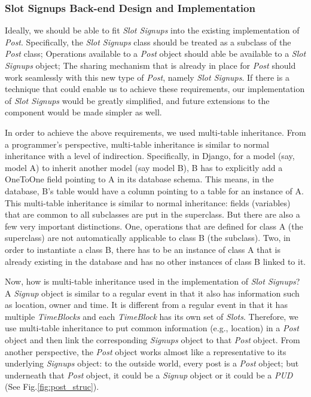 \documentclass[a4paper]{article}
\begin{document}
\subsubsection{Slot Signups Back-end Design and Implementation}
Ideally, we should be able to fit \emph{Slot Signups} into the existing implementation of \emph{Post}. Specifically, the \emph{Slot Signups} class should be treated as a subclass of the \emph{Post} class; Operations available to a \emph{Post} object should able be available to a \emph{Slot Signups} object; The sharing mechanism that is already in place for \emph{Post} should work seamlessly with this new type of \emph{Post}, namely \emph{Slot Signups}. If there is a technique that could enable us to achieve these requirements, our implementation of \emph{Slot Signups} would be greatly simplified, and future extensions to the component would be made simpler as well.

In order to achieve the above requirements, we used multi-table inheritance. From a programmer's perspective, multi-table inheritance is similar to normal inheritance with a level of indirection. Specifically, in Django, for a model (say, model A) to inherit another model (say model B), B has to explicitly add a OneToOne field pointing to A in its database schema. This means, in the database, B's table would have a column pointing to a table for an instance of A. This multi-table inheritance is similar to normal inheritance: fields (variables) that are common to all subclasses are put in the superclass. But there are also a few very important distinctions. One, operations that are defined for class A (the superclass) are not automatically applicable to class B (the subclass). Two, in order to instantiate a class B, there has to be an instance of class A that is already existing in the database and has no other instances of class B linked to it. 

Now, how is multi-table inheritance used in the implementation of \emph{Slot Signups}? A \emph{Signup} object is similar to a regular event in that it also has information such as location, owner and time. It is different from a regular event in that it has multiple \emph{TimeBlocks} and each \emph{TimeBlock} has its own set of \emph{Slots}. Therefore, we use multi-table inheritance to put common information (e.g., location) in a \emph{Post} object and then link the corresponding \emph{Signups} object to that \emph{Post} object. From another perspective, the \emph{Post} object works almost like a representative to its underlying \emph{Signups} object: to the outside world, every post is a \emph{Post} object; but underneath that \emph{Post} object, it could be a \emph{Signup} object or it could be a \emph{PUD} (See Fig.\ref{fig:post_struc}). 
\end{document}
